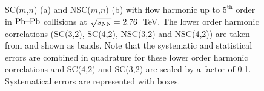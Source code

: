 \begin{figure}[h]
            \begin{center}
        \caption{SC($m$,$n$) (a) and NSC($m$,$n$) (b) with flow harmonic up to $5^{\mathrm{th}}$ order in $\textnormal{Pb--Pb}$ collisions at $\sqrt{s_{\textnormal{NN}}}=2.76$~TeV. The lower order harmonic correlations (SC(3,2), SC(4,2), NSC(3,2) and NSC(4,2)) are taken from \cite{ALICE:2016kpq} and shown as bands. Note that the systematic and statistical errors are combined in quadrature for these lower order harmonic correlations and SC(4,2) and SC(3,2) are scaled by a factor of 0.1. Systematical errors are represented with boxes.}
        \label{fig:Figure_1}
              \end{center}
\end{figure}

